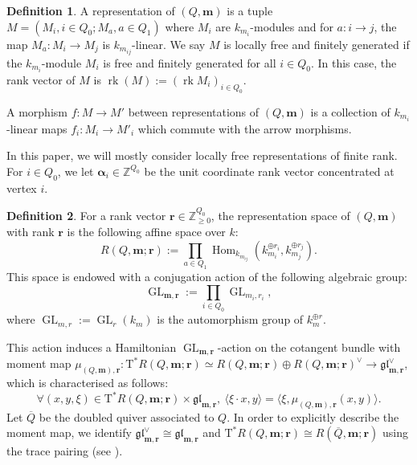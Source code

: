 \documentclass[a4paper,12pt]{article}
\theoremstyle{definition}
\newtheorem{definition}{Definition}[section]
\theoremstyle{plain}
\theoremstyle{remark}
\DeclareMathOperator{\GL}{GL}
\DeclareMathOperator{\Hom}{Hom}
\DeclareMathOperator{\rk}{rk}
\newcommand\gl{\mathfrak{gl}}
\newcommand\bbZ{\mathbb{Z}}
\newcommand\bfalpha{\bm{\alpha}}
\newcommand\bfm{\mathbf{m}}
\newcommand\bfr{\mathbf{r}}
\newcommand\rmT{\mathrm{T}}
\begin{document}
\begin{definition}\label{def/quiver rep with mult}
A representation of $(Q,\bfm)$ is a tuple $M = (M_i, i \in Q_0;M_a, a \in Q_1)$ where $M_i$ are $k_{m_i}$-modules and for $a \colon i \rightarrow j$, the map $M_a \colon M_{i}\rightarrow M_{j}$ is $k_{m_{ij}}$-linear. We say $M$ is locally free and finitely generated if the $k_{m_i}$-module $M_i$ is free and finitely generated for all $i \in Q_0$. In this case, the rank vector of $M$ is $\rk(M):=(\rk M_i)_{i\in Q_0}$.

A morphism $f \colon M\rightarrow M'$ between representations of $(Q,\bfm)$ is a collection of $k_{m_i}$-linear maps $f_i \colon M_i\rightarrow M'_i$ which commute with the arrow morphisms.
\end{definition}

In this paper, we will mostly consider locally free representations of finite rank. For $i\in Q_0$, we let $\bfalpha_i\in\bbZ^{Q_0}$ be the unit coordinate rank vector concentrated at vertex $i$.

\begin{definition}\label{Def action on rep space}
For a rank vector $\bfr\in\bbZ_{\geq0}^{Q_0}$, the representation space of $(Q,\bfm)$ with rank $\bfr$ is the following affine space over $k$:
\[
R(Q,\bfm;\bfr):=\prod_{a\in Q_1}\Hom_{k_{m_{ij}}}\left(k_{m_i}^{\oplus r_i},k_{m_j}^{\oplus r_j}\right).
\]
This space is endowed with a conjugation action of the following algebraic group:
\[
\GL_{\bfm,\bfr}:=\prod_{i\in Q_0}\GL_{m_i,r_i},
\]
where $\GL_{m,r}:= \GL_r(k_{m})$ is the automorphism group of $k_m^{\oplus r}$. 
\end{definition}

This action induces a Hamiltonian $\GL_{\bfm,\bfr}$-action on the cotangent bundle 
with moment map $\mu_{(Q,\bfm),\bfr} \colon \rmT^*R(Q,\bfm;\bfr)\simeq R(Q,\bfm;\bfr)\oplus R(Q,\bfm;\bfr)^\vee\rightarrow\gl_{\bfm,\bfr}^{\vee}$, which is characterised as follows:
\[
\forall (x,y,\xi)\in \mathrm{T}^*R(Q,\bfm;\bfr)\times\gl_{\bfm,\bfr},\ \langle\xi\cdot x,y\rangle=\langle\xi,\mu_{(Q,\bfm),\bfr}(x,y)\rangle
.
\]
Let $\overline{Q}$ be the doubled quiver associated to $Q$. In order to explicitly describe the moment map, we identify $\gl_{\bfm,\bfr}^{\vee}\cong \gl_{\bfm,\bfr}$ and $\mathrm{T}^*R(Q,\bfm;\bfr)\cong R(\overline{Q},\bfm;\bfr)$ using the trace pairing (see \cite[\S 8]{GLS17a}\cite[\S 1.2]{Ver24b}\cite[\S 2.6]{HJV25}).
\end{document}
